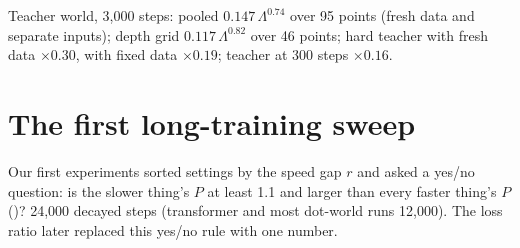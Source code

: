 \documentclass[11pt]{article}
\newcommand{\Lam}{\Lambda}
\begin{document}
Teacher world, 3,000 steps: pooled $0.147\,\Lam^{0.74}$ over 95 points (fresh data and separate inputs); depth grid $0.117\,\Lam^{0.82}$ over 46 points; hard teacher with fresh data $\times0.30$, with fixed data $\times0.19$; teacher at 300 steps $\times0.16$.

\section{The first long-training sweep}
\label{app:first}

Our first experiments sorted settings by the speed gap $r$ and asked a yes/no question: is the slower thing's $P$ at least 1.1 and larger than every faster thing's $P$ (\checkmark)? 24,000 decayed steps (transformer and most dot-world runs 12,000). The loss ratio later replaced this yes/no rule with one number.
\end{document}
